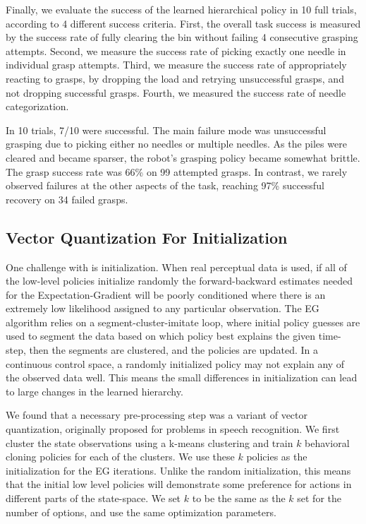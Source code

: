 Finally, we evaluate the success of the learned hierarchical policy in 10 full trials, according to 4 different success criteria. First, the overall task success is measured by the success rate of fully clearing the bin without failing 4 consecutive grasping attempts. Second, we measure the success rate of picking exactly one needle in individual grasp attempts. Third, we measure the success rate of appropriately reacting to grasps, by dropping the load and retrying unsuccessful grasps, and not dropping successful grasps. Fourth, we measured the success rate of needle categorization.

In 10 trials, 7/10 were successful. The main failure mode was unsuccessful grasping due to picking either no needles or multiple needles. As the piles were cleared and became sparser, the robot's grasping policy became somewhat brittle. The grasp success rate was 66\% on 99 attempted grasps. In contrast, we rarely observed failures at the other aspects of the task, reaching 97\% successful recovery on 34 failed grasps. 


\subsection*{Vector Quantization For Initialization}
One challenge with \alg is initialization.
When real perceptual data is used, if all of the low-level policies initialize randomly the forward-backward estimates needed for the Expectation-Gradient will be poorly conditioned where there is an extremely low likelihood assigned to any particular observation.
The EG algorithm relies on a segment-cluster-imitate loop, where initial policy guesses are used to segment the data based on which policy best explains the given time-step, then the segments are clustered, and the policies are updated.
In a continuous control space, a randomly initialized policy may not explain any of the observed data well.
This means the small differences in initialization can lead to large changes in the learned hierarchy.

We found that a necessary pre-processing step was a variant of vector quantization, originally proposed for problems in speech recognition. 
We first cluster the state observations using a \textsf{k-means} clustering and train $k$ behavioral cloning policies for each of the clusters.
We use these $k$ policies as the initialization for the EG iterations.
Unlike the random initialization, this means that the initial low level policies will demonstrate some preference for actions in different parts of the state-space.
We set $k$ to be the same as the $k$ set for the number of options, and use the same optimization parameters.

